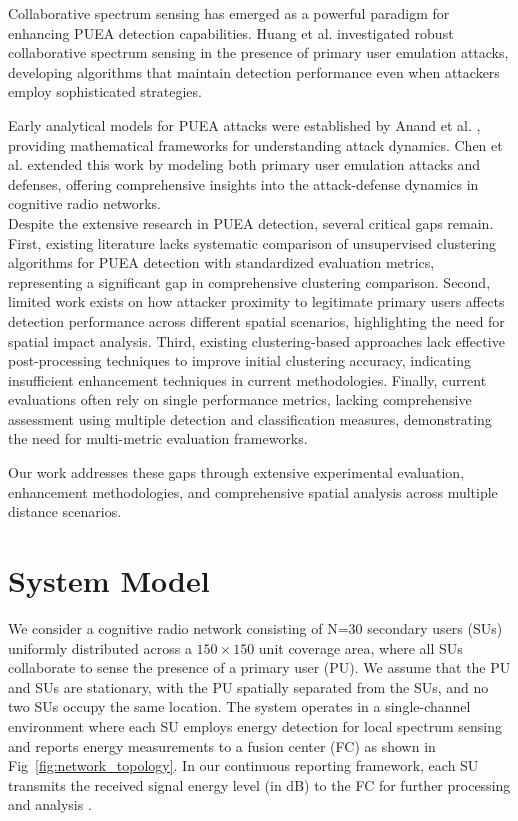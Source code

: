 \documentclass[pdflatex,sn-mathphys-num]{sn-jnl}%
\theoremstyle{thmstyleone}
\theoremstyle{thmstyletwo}
\theoremstyle{thmstylethree}
\begin{document}
Collaborative spectrum sensing has emerged as a powerful paradigm for enhancing PUEA detection capabilities. Huang et al. \cite{ref8} investigated robust collaborative spectrum sensing in the presence of primary user emulation attacks, developing algorithms that maintain detection performance even when attackers employ sophisticated strategies.

Early analytical models for PUEA attacks were established by Anand et al. \cite{ref16}, providing mathematical frameworks for understanding attack dynamics. Chen et al. \cite{ref17} extended this work by modeling both primary user emulation attacks and defenses, offering comprehensive insights into the attack-defense dynamics in cognitive radio networks.\\

Despite the extensive research in PUEA detection, several critical gaps remain. First, existing literature lacks systematic comparison of unsupervised clustering algorithms for PUEA detection with standardized evaluation metrics, representing a significant gap in comprehensive clustering comparison. Second, limited work exists on how attacker proximity to legitimate primary users affects detection performance across different spatial scenarios, highlighting the need for spatial impact analysis. Third, existing clustering-based approaches lack effective post-processing techniques to improve initial clustering accuracy, indicating insufficient enhancement techniques in current methodologies. Finally, current evaluations often rely on single performance metrics, lacking comprehensive assessment using multiple detection and classification measures, demonstrating the need for multi-metric evaluation frameworks.

Our work addresses these gaps through extensive experimental evaluation, enhancement methodologies, and comprehensive spatial analysis across multiple distance scenarios.


\section{System Model}\label{sec3}

We consider a cognitive radio network consisting of N=30 secondary users (SUs) uniformly distributed across a $150 \times 150$ unit coverage area, where all SUs collaborate to sense the presence of a primary user (PU). We assume that the PU and SUs are stationary, with the PU spatially separated from the SUs, and no two SUs occupy the same location. The system operates in a single-channel environment where each SU employs energy detection for local spectrum sensing and reports energy measurements to a fusion center (FC) as shown in Fig~\ref{fig:network_topology}. In our continuous reporting framework, each SU transmits the received signal energy level (in dB) to the FC for further processing and analysis \cite{ref23}.
\end{document}
